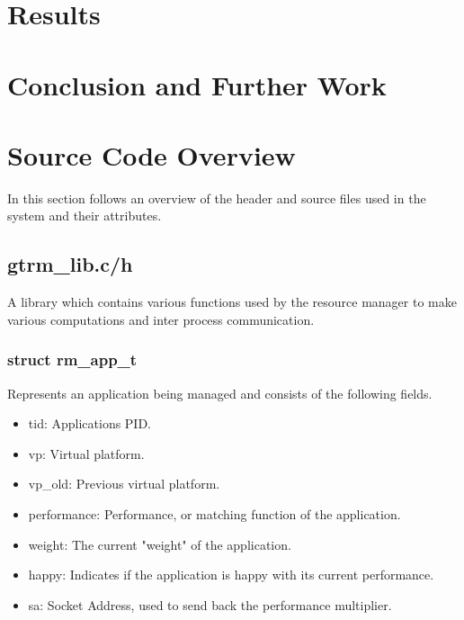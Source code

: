 \documentclass[nobiblatex]{LTHthesis}
\begin{document}
\chapter{Results}
\label{chp:results}

\chapter{Conclusion and Further Work}
\label{chp:conclusion}





\appendix
\chapter{Source Code Overview}
In this section follows an overview of the header and source files used in the system and their attributes.
\section{gtrm\_lib.c/h}
A library which contains various functions used by the resource manager to make various computations and inter process communication.

\subsection{struct rm\_app\_t}
Represents an application being managed and consists of the following fields.
\begin{itemize}
\item tid: Applications PID.
\item vp: Virtual platform.
\item vp\_old: Previous virtual platform.
\item performance: Performance, or matching function of the application.
\item weight: The current "weight" of the application.
\item happy: Indicates if the application is happy with its current performance.
\item sa: Socket Address, used to send back the performance multiplier.
\end{itemize}
\end{document}
